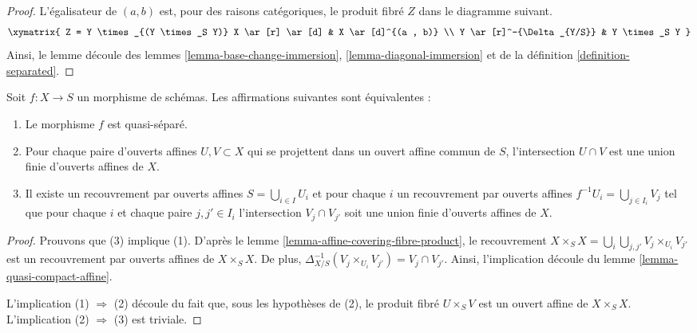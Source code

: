 \begin{proof}
L'égalisateur de $(a, b)$ est, pour des raisons catégoriques,
le produit fibré $Z$ dans le diagramme suivant.
$$
\xymatrix{
Z = Y \times_{(Y \times_S Y)} X \ar[r] \ar[d] &
 X \ar[d]^{(a , b)} \\
Y \ar[r]^-{\Delta_{Y/S}} & Y \times_S Y
}
$$
Ainsi, le lemme découle des lemmes
\ref{lemma-base-change-immersion}, \ref{lemma-diagonal-immersion} et de la
définition \ref{definition-separated}.
\end{proof}

\begin{lemma}
\label{lemma-characterize-quasi-separated}
Soit $f : X \to S$ un morphisme de schémas. Les affirmations
suivantes sont équivalentes :
\begin{enumerate}
\item Le morphisme $f$ est quasi-séparé. \item
Pour chaque paire d'ouverts affines $U, V \subset X$ qui se
projettent dans un ouvert affine commun de $S$, l'intersection $U
\cap V$ est une union finie d'ouverts affines de $X$. \item
Il existe un recouvrement par ouverts affines $S = \bigcup_{i \in I} U_i$
et pour chaque $i$ un recouvrement par ouverts affines $f^{-1}U_i = \bigcup_{j \in I_i}
V_j$ tel que pour chaque $i$ et chaque paire $j, j' \in I_i$
l'intersection $V_j \cap V_{j'}$ soit une union finie d'ouverts
affines de $X$.
\end{enumerate}
\end{lemma}

\begin{proof}
Prouvons que (3) implique (1). D'après
le lemme \ref{lemma-affine-covering-fibre-product},
le recouvrement $X \times_S X = \bigcup_i \bigcup_{j, j'} V_j \times_{U_i} V_{j'}$
est un recouvrement par ouverts affines de $X
\times_S X$. De plus, $\Delta_{X/S}^{-1}(V_j \times_{U_i} V_{j'}) = V_j \cap
V_{j'}$. Ainsi, l'implication découle du lemme \ref{lemma-quasi-compact-affine}.

\medskip\noindent
L'implication (1) $\Rightarrow$ (2) découle du fait que,
sous les hypothèses de (2), le produit fibré $U
\times_S V$ est un ouvert affine de $X \times_S X$.
L'implication (2) $\Rightarrow$ (3) est triviale.
\end{proof}

